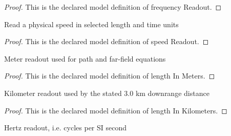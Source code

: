 \begin{proof}
  This is the declared model definition of frequency Readout.
\end{proof}
\begin{definition}
  \label{def:physics:phyx-mini-0247:phyxminiproblems-problemphyxmini0247-speedreadout}
  Read a physical speed in selected length and time units
\end{definition}
\begin{proof}
  This is the declared model definition of speed Readout.
\end{proof}
\begin{definition}
  \label{def:physics:phyx-mini-0247:phyxminiproblems-problemphyxmini0247-lengthinmeters}
  Meter readout used for path and far-field equations
\end{definition}
\begin{proof}
  This is the declared model definition of length In Meters.
\end{proof}
\begin{definition}
  \label{def:physics:phyx-mini-0247:phyxminiproblems-problemphyxmini0247-lengthinkilometers}
  Kilometer readout used by the stated 3.0 km downrange distance
\end{definition}
\begin{proof}
  This is the declared model definition of length In Kilometers.
\end{proof}
\begin{definition}
  \label{def:physics:phyx-mini-0247:phyxminiproblems-problemphyxmini0247-frequencyinhertz}
  Hertz readout, i.e. cycles per SI second
\end{definition}
